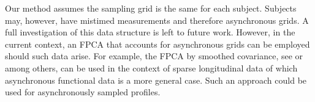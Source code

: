 \documentclass[12pt]{article}
\theoremstyle{plain}
\begin{document}
	Our method assumes the sampling grid is the same for each subject. Subjects may, however, have mistimed measurements and therefore asynchronous grids. A full investigation of this data structure is left to future work. However, in the current context, an FPCA that accounts for asynchronous grids can be employed should such data arise. For example, the FPCA by smoothed covariance, see \cite{Yao2005} or \cite{Di2009} among others, can be used in the context of sparse longitudinal data of which asynchronous functional data is a more general case. Such an approach could be used for asynchronously sampled profiles.
	
\end{document}
